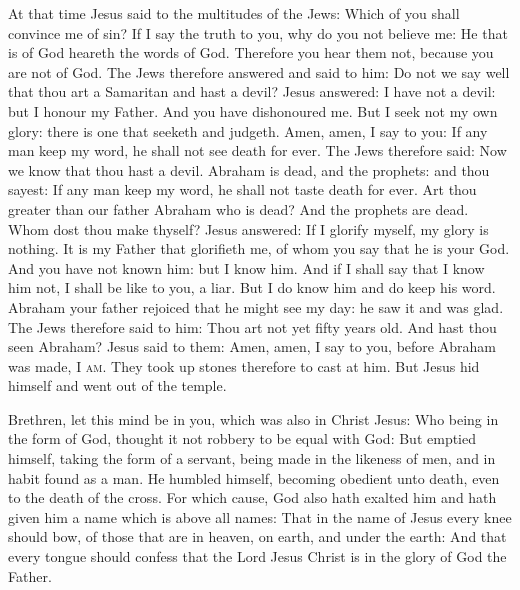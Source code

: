
At that time Jesus said to the multitudes of the Jews:
Which of you shall convince me of sin? If I say the truth to you, why do you
not believe me: He that is of God heareth the words of God. Therefore you hear
them not, because you are not of God.  The Jews therefore answered and said to
him: Do not we say well that thou art a Samaritan and hast a devil?  Jesus
answered: I have not a devil: but I honour my Father. And you have dishonoured
me.  But I seek not my own glory: there is one that seeketh and judgeth.  Amen,
amen, I say to you: If any man keep my word, he shall not see death for ever.
The Jews therefore said: Now we know that thou hast a devil.  Abraham is dead,
and the prophets: and thou sayest: If any man keep my word, he shall not taste
death for ever.  Art thou greater than our father Abraham who is dead? And the
prophets are dead. Whom dost thou make thyself?  Jesus answered: If I glorify
myself, my glory is nothing.  It is my Father that glorifieth me, of whom you
say that he is your God.  And you have not known him: but I know him. And if I
shall say that I know him not, I shall be like to you, a liar. But I do know
him and do keep his word.  Abraham your father rejoiced that he might see my
day: he saw it and was glad.  The Jews therefore said to him: Thou art not yet
fifty years old.  And hast thou seen Abraham?  Jesus said to them: Amen, amen,
I say to you, before Abraham was made, \textsc{I am}.  They took up stones
therefore to cast at him. But Jesus hid himself and went out of the temple.





Brethren, let this mind be in you, which was also in Christ Jesus: Who being in the
form of God, thought it not robbery to be equal with God: But emptied himself,
taking the form of a servant, being made in the likeness of men, and in habit
found as a man.
  He humbled
himself, becoming obedient unto death, even to the death of the cross.  For
which cause, God also hath exalted him and hath given him a name which is above
all names: That in the name of Jesus every knee should bow, of those that are
in heaven, on earth, and under the earth: And that every tongue should confess
that the Lord Jesus Christ is in the glory of God the Father.


